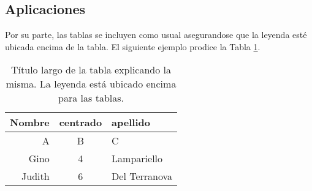 \subsection{Aplicaciones}

\par Por su parte, las tablas se incluyen como usual asegurandose que la leyenda est\'e ubicada encima de la tabla. El siguiente ejemplo prodice la Tabla \ref{tbl:tabla1}.
\begin{table}
\begin{center}
\caption[T\'itulo corto]{T\'itulo largo de la tabla explicando la misma. La leyenda est\'a ubicado encima para las tablas.}
\label{tbl:tabla1}
\begin{tabular}{rcl}
\hline
Nombre & centrado & apellido\\
\hline
A & B & C \\
Gino & 4 & Lampariello \\
Judith & 6 & Del Terranova\\
\hline
\end{tabular}
\end{center}
\end{table}